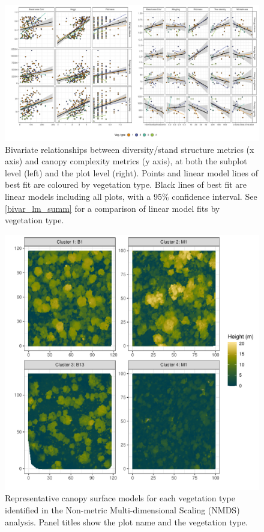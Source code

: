 \documentclass[11pt,a4paper]{article}
\begin{document}
\begin{landscape}
\begin{figure}
	\includegraphics[width=\linewidth]{bivar}
	\caption[Bivariate plots comparing diversity, stand structure and canopy complexity]{Bivariate relationships between diversity/stand structure metrics (x axis) and canopy complexity metrics (y axis), at both the subplot level (left) and the plot level (right). Points and linear model lines of best fit are coloured by vegetation type. Black lines of best fit are linear models including all plots, with a 95\% confidence interval. See \autoref{bivar_lm_summ} for a comparison of linear model fits by vegetation type.}
	\label{subplot_canopy_bivar}
\end{figure}
\end{landscape}

\begin{figure}
	\includegraphics[width=\linewidth]{veg_type_tile}
	\caption{Representative canopy surface models for each vegetation type identified in the Non-metric Multi-dimensional Scaling (NMDS) analysis. Panel titles show the plot name and the vegetation type.}
	\label{veg_type_tile}
\end{figure}
\end{document}
